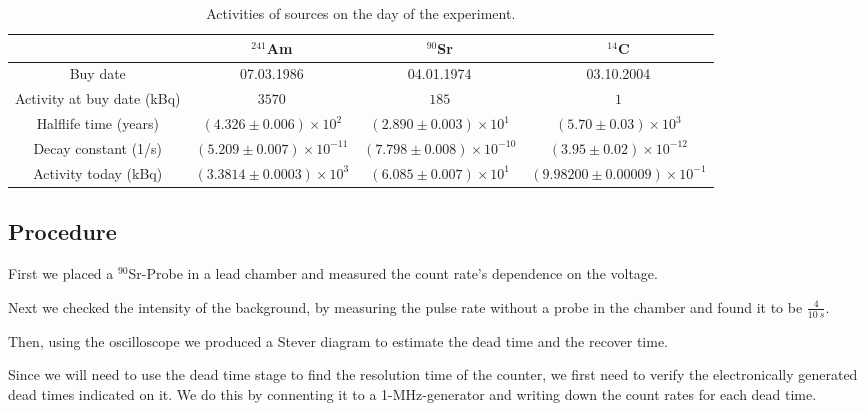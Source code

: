 \begin{table}[H]
        \renewcommand{\arraystretch}{1}
        \centering
        \Large
        \begin{adjustbox}{width=\textwidth}
                \begin{tabular}{|c|c|c|c|}
                        \hline
                        & ${}^{241}$Am & ${}^{90}$Sr & ${}^{14}$C \\
                        \hline
                        Buy date & 07.03.1986 & 04.01.1974 & 03.10.2004 \\
                        \hline
                        Activity at buy date (kBq) & $3570$ & $185$ & $1$ \\
                        \hline
                        Halflife time (years) & $\left(4.326 \pm 0.006\right) \times 10^{2}$ & $\left(2.890 \pm 0.003\right) \times 10^{1}$ & $\left(5.70 \pm 0.03\right) \times 10^{3}$ \\
                        \hline
                        Decay constant (1/s) & $\left(5.209 \pm 0.007\right) \times 10^{-11}$ & $\left(7.798 \pm 0.008\right) \times 10^{-10}$ & $\left(3.95 \pm 0.02\right) \times 10^{-12}$ \\
                        \hline
                        Activity today (kBq) & $\left(3.3814 \pm 0.0003\right) \times 10^{3}$ & $\left(6.085 \pm 0.007\right) \times 10^{1}$ & $\left(9.98200 \pm 0.00009\right) \times 10^{-1}$ \\
                        \hline
                \end{tabular}
        \end{adjustbox}
        \caption{Activities of sources on the day of the experiment.}
        \label{tab:Activity}
\end{table}   

\subsection{Procedure}

First we placed a ${}^{90}$Sr-Probe in a lead chamber and measured the count rate's dependence on the voltage.

Next we checked the intensity of the background, by measuring the pulse rate without a probe in the chamber and found it to be $\frac{4}{\SI{10}{s}}$.

Then, using the oscilloscope we produced a Stever diagram to estimate the dead time and the recover time.

Since we will need to use the dead time stage to find the resolution time of the counter, we first need to verify the electronically generated dead times indicated on it. We do this by connenting it to a 1-MHz-generator and writing down the count rates for each dead time.

